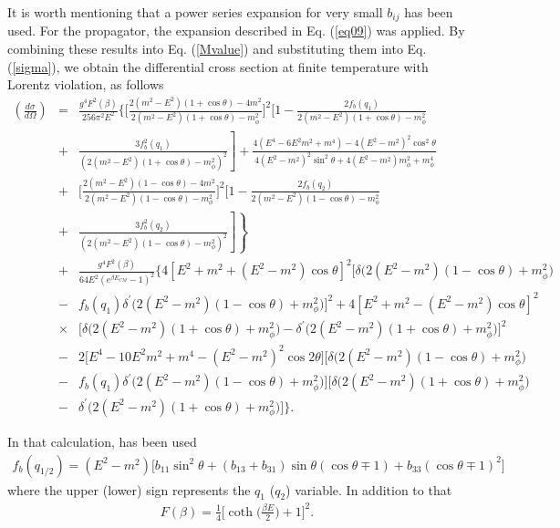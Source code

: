 \documentclass[11pt,showpacs,preprintnumbers,amsmath,amssymb,prd,nofootinbib,superscriptaddress]{revtex4-2}
\begin{document}
It is worth mentioning that a power series expansion for very small $b_{ij}$ has been used. For the propagator, the expansion described in Eq. (\ref{eq09}) was applied. By combining these results into Eq. (\ref{Mvalue}) and substituting them into Eq. (\ref{sigma}), we obtain the differential cross section at finite temperature with Lorentz violation, as follows
{\color{red} \begin{eqnarray}\left(\frac{d\sigma}{d\Omega}\right)&=&\frac{g^4F^2(\beta)}{256\pi^2 E^2}\biggl\{\biggl[\frac{2(m^2-E^2)(1+\cos{\theta})-4m^2}{2(m^2-E^2)(1+\cos{\theta})-m_\phi^2}\biggr]^2\biggl[1-\frac{2f_b(q_1)}{2(m^2-E^2)(1+\cos{\theta})-m_\phi^2}\nonumber\\&+&\left.\frac{3f_b^2(q_1)}{\left(2(m^2-E^2)(1+\cos{\theta})-m_\phi^2\right)^2}\right]+\frac{4(E^4-6E^2m^2+m^4)-4(E^2-m^2)^2\cos^2{\theta}}{4(E^2-m^2)^2\sin^2{\theta}+4(E^2-m^2)m_\phi^2+m_\phi^4}\nonumber\\&+&\biggl[\frac{2(m^2-E^2)(1-\cos{\theta})-4m^2}{2(m^2-E^2)(1-\cos{\theta})-m_\phi^2}\biggr]^2\biggl[1-\frac{2f_b(q_2)}{2(m^2-E^2)(1-\cos{\theta})-m_\phi^2}\nonumber\\ &+&\left.\left.\frac{3f_b^2(q_2)}{\left(2(m^2-E^2)(1-\cos{\theta})-m_\phi^2\right)^2}\right]\right\}\nonumber\\&+&\frac{g^4F^2(\beta)}{64E^2(e^{\beta E_{CM}}-1)^2}\biggl\{4\left[E^2+m^2+(E^2-m^2)\cos{\theta}\right]^2\biggl[\delta\biggl(2(E^2-m^2)(1-\cos{\theta})+m_\phi^2\biggr)\nonumber\\&-&f_b(q_1)\delta^\prime\biggl(2(E^2-m^2)(1-\cos{\theta})+m_\phi^2\biggr)\biggr]^2+4\left[E^2+m^2-(E^2-m^2)\cos{\theta}\right]^2\nonumber\\&\times&\biggl[\delta\biggl(2(E^2-m^2)(1+\cos{\theta})+m_\phi^2\biggr)-\delta^\prime\biggl(2(E^2-m^2)(1+\cos{\theta})+m_\phi^2\biggr)\biggr]^2\nonumber\\&-&2\biggl[E^4-10E^2m^2+m^4-(E^2-m^2)^2\cos{2\theta}\biggr]\biggl[\delta\biggl(2(E^2-m^2)(1-\cos{\theta})+m_\phi^2\biggr)\nonumber\\&-&f_b(q_1)\delta^\prime\biggl(2(E^2-m^2)(1-\cos{\theta})+m_\phi^2\biggr)\biggr]\biggl[\delta\biggl(2(E^2-m^2)(1+\cos{\theta})+m_\phi^2\biggr)\nonumber\\&-&\delta^\prime\biggl(2(E^2-m^2)(1+\cos{\theta})+m_\phi^2\biggr)\biggr]\biggl\}.\label{eq22}
\end{eqnarray}}

In that calculation, has been used
\begin{eqnarray}f_b(q_{1/2})=(E^2-m^2)\biggl[b_{11}\sin^2{\theta}+(b_{13}+b_{31})\sin{\theta}(\cos{\theta}\mp1)+b_{33}(\cos{\theta}\mp1)^2\biggr]\end{eqnarray}
where the upper (lower) sign represents the $q_1$ ($q_2$) variable. In addition to that
\begin{eqnarray}F(\beta)=\frac{1}{4}\biggl[\coth{\biggl(\frac{\beta E}{2}\biggr)}+1\biggr]^2.\label{eq21}
\end{eqnarray}
\end{document}
